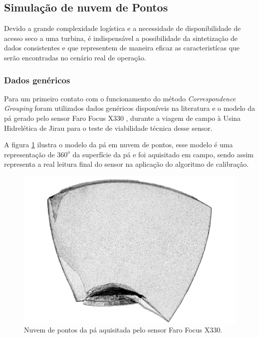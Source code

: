 \subsection{Simulação de nuvem de Pontos}

Devido a grande complexidade logística e a necessidade de disponibilidade de
acesso seco a uma turbina, é indispensável a possibilidade da sintetização de
dados consistentes e que representem de maneira eficaz as caracteristícas que
serão encontradas no cenário real de operação. 

\subsubsection{Dados genéricos}

Para um primeiro contato com o funcionamento do método \textit{Correspondence
Grouping} foram utilizados dados genéricos disponíveis na
literatura\footnotemark {} e o modelo da pá gerado pelo sensor Faro Focus X330 , durante a viagem de campo
à Usina Hidrelética de Jirau para o teste de viabilidade técnica desse sensor.


A figura \ref{fig::modelo_pa_faro} ilustra o modelo da pá em nuvem de pontos,
esse modelo é uma representação de $360^o$ da superfície da pá e foi aquisitado em
campo, sendo assim representa a real leitura final do sensor na aplicação do
algoritmo de calibração.

\begin{figure}[h!]
	\centering
	\includegraphics[width=0.9\columnwidth]{method/figs/calibracao/modelo_pa_faro}
	\caption{Nuvem de pontos da pá aquisitada pelo sensor Faro Focus X330.}
    \label{fig::modelo_pa_faro}
\end{figure}

